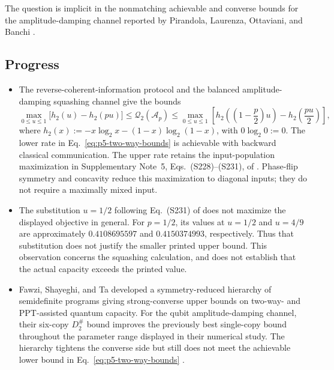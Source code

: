 The question is implicit in the nonmatching achievable and converse bounds
for the amplitude-damping channel reported by Pirandola, Laurenza,
Ottaviani, and Banchi .

\subsection*{Progress}

\begin{itemize}
  \item The reverse-coherent-information protocol and the balanced
  amplitude-damping squashing channel give the bounds
  \begin{equation}
    \max_{0\le u\le1}\bigl[h_2(u)-h_2(pu)\bigr]
    \le \mathcal{Q}_2(\mathcal A_p)
    \le \max_{0\le u\le1}\left[
       h_2\!\left(\left(1-\frac p2\right)u\right)
       -h_2\!\left(\frac{pu}{2}\right)\right],
    \label{eq:p5-two-way-bounds}
  \end{equation}
  where $h_2(x):=-x\log_2x-(1-x)\log_2(1-x)$, with $0\log_2 0:=0$.
  The lower rate in Eq.~\eqref{eq:p5-two-way-bounds} is achievable with
  backward classical communication. The upper rate retains the
  input-population maximization in Supplementary Note~5,
  Eqs.~(S228)--(S231), of .
  Phase-flip symmetry and concavity reduce this maximization to diagonal
  inputs; they do not require a maximally mixed input.

  \item The substitution $u=1/2$ following Eq.~(S231) of
   does not maximize the displayed
  objective in general. For $p=1/2$, its values at $u=1/2$ and $u=4/9$
  are approximately $0.4108695597$ and $0.4150374993$, respectively.
  Thus that substitution does not justify the smaller printed upper
  bound. This observation concerns the squashing calculation, and does
  not establish that the actual capacity exceeds the printed value.

  \item Fawzi, Shayeghi, and Ta developed a symmetry-reduced hierarchy of
  semidefinite programs giving strong-converse upper bounds on two-way- and
  PPT-assisted quantum capacity.  For the qubit amplitude-damping channel,
  their six-copy $D^{\#}_2$ bound improves the previously best single-copy
  bound throughout the parameter range displayed in their numerical study.
  The hierarchy tightens the converse side but still does not meet the
  achievable lower bound in Eq.~\eqref{eq:p5-two-way-bounds}
  .
\end{itemize}

